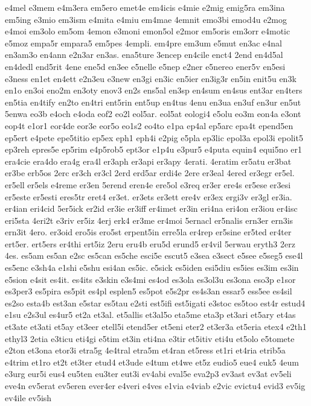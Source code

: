 {e4mel
e3mem
e4m3era
em5ero
emet4e
em4icis
e4mie
e2mig
emig5ra
em3ina
em5ing
e3mio
em3ism
e4mita
e4miu
em4mae
4emnit
emo3bi
emod4u
e2mog
e4moi
em3olo
em5om
4emon
e3moni
emon5ol
e2mor
em5oris
em3orr
e4motic
e5moz
empa5r
empara5
em5pes
4empli.
em4pre
em3um
e5mut
en3ac
e4nal
en3am3o
en4ann
e2n3ar
en3as.
ena5ture
3encep
en4cile
enct4
2end
en4d5al
en4dedl
end5rit
4ene
ene5d
en3ee
e5nelle
e5nep
e2ner
e5nereo
ener5v
en5esi
e3ness
en1et
en4ett
e2n3eu
e3new
en3gi
en3ic
en5ier
en3ig3r
en5in
enit5u
en3k
en1o
en3oi
eno2m
en3oty
enov3
en2s
ens5al
en3sp
en4sum
en4sus
ent3ar
en4ters
en5tia
en4tify
en2to
en4tri
ent5rin
ent5up
en4tus
4enu
en3ua
en3uf
en3ur
en5ut
5enwa
eo3b
e4och
e4oda
eof2
eo2l
eol5ar.
eol5at
eologi4
e5olu
eo3m
eon4a
e3ont
eop4t
e1or1
eor4de
eor3e
eor5o
eo1s2
eo4to
e1pa
ep4al
ep5arc
epa4t
epend5en
ep5ert
e4pete
epe5titio
ep5ex
eph1
eph4i
e2pig
e5pla
ep3lic
epol3a
epol3i
epolit5
ep3reh
epres5e
ep5rim
e4p5rob5
ept3or
e1p4u
e3pur5
e4puta
equin4
equi5no
er1
era4cie
era4do
era4g
era4l
er3aph
er3api
er3apy
4erati.
4eratim
er5atu
er3bat
er3be
erb5os
2erc
er3ch
er3cl
2erd
erd5ar
erdi4e
2ere
er3eal
4ered
er3egr
er5el.
er5ell
er5els
e4reme
er3en
5erend
eren4e
ere5ol
e3req
er3er
ere4s
er5ese
er3esi
er5este
er5esti
eres5tr
eret4
er3et.
er3ets
er3ett
ere4v
er3ex
ergi3v
er3gl
er3ia.
er4ian
eri4cid
5er5ick
er2id
er3ie
er3iff
er4imet
er3in
eri4na
eri4on
er3iou
er4isc
eri5sta
4eri2t
e3riv
er5iz
4erj
erk4
er3me
er4moi
5ernacl
er5nalis
ern3er
ern3is
ern3it
4ero.
er3oid
ero5is
ero5st
erpent5in
erre5la
er4rep
er5sine
er5ted
er4ter
ert5er.
ert5ers
er4thi
ert5iz
2eru
eru4b
eru5d
erund5
er4vil
5erwau
eryth3
2erz
4es.
es5am
es5an
e2sc
es5can
es5che
esci5e
escut5
e3sea
e3sect
e5see
e5seg5
ese4l
es5enc
e3sh4a
e1shi
e5shu
esi4an
es5ic.
e5sick
es5iden
esi5diu
es5ies
es3im
es3in
e5sion
e4sit
es4it.
es4its
e3skin
e3s4mi
es4od
es3ola
es3ol3u
es3ona
eso3p
e1sor
es3per3
es5pira
es5pit
es4pl
esplen5
es5pot
e5s2pr
es4s3an
essar5
ess5ee
es4sil
es2so
esta4b
est3an
e5star
es5tau
e2sti
est5ifi
est5igati
e3stoc
es5too
est4r
estud4
e1su
e2s3ul
es4ur5
et2a
et3al.
et5allis
et3al5o
eta5me
eta3p
et3ari
et5ary
et4as
et3ate
et3ati
et5ay
et3eer
etell5i
etend5er
et5eni
eter2
et3er3a
et5eria
etex4
e2th1
ethyl3
2etia
e3ticu
eti4gi
e5tim
et3in
eti4na
e3tir
et5itiv
eti4u
et5olo
e5tomete
e2ton
et3ona
etor3i
etra5g
4e4tral
etra5m
et4ran
et5ress
et1ri
et4ria
etrib5a
e4trim
et1ro
et2t
et3ter
etud4
et3ude
e4tum
et4we
et5z
eudio5
eue4
euk5
4eum
e3urg
eur5i
eus4
eu5ten
eu3ter
eut3i
ev4abi
eval5e
eva2p3
ev3ast
ev3at
ev5eli
eve4n
ev5erat
ev5eren
ever4er
e4veri
e4ves
e1via
e4viab
e2vic
evictu4
evid3
ev5ig
ev4ile
ev5ish
}
